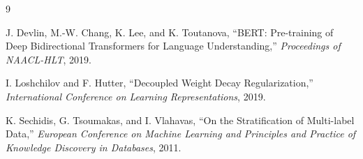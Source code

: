 \documentclass[11pt,a4paper]{report}
\begin{document}
\begin{thebibliography}{9}

J. Devlin, M.-W. Chang, K. Lee, and K. Toutanova,
``BERT: Pre-training of Deep Bidirectional Transformers for Language Understanding,''
\emph{Proceedings of NAACL-HLT}, 2019.

I. Loshchilov and F. Hutter,
``Decoupled Weight Decay Regularization,''
\emph{International Conference on Learning Representations}, 2019.

K. Sechidis, G. Tsoumakas, and I. Vlahavas,
``On the Stratification of Multi-label Data,''
\emph{European Conference on Machine Learning and Principles and Practice of Knowledge Discovery in Databases}, 2011.

\end{thebibliography}
\end{document}
